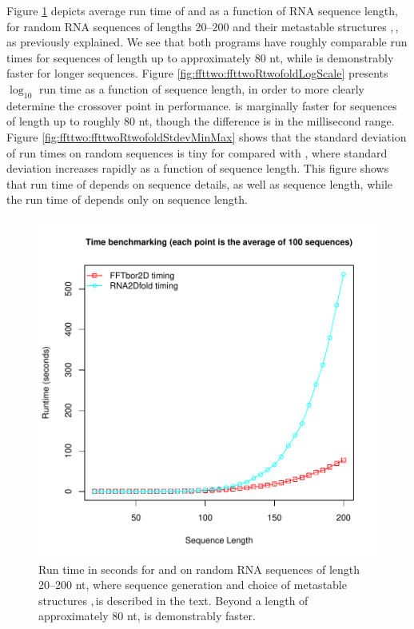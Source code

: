 Figure \ref{fig:ffttwo:ffttwoRtwofoldTiming} depicts average run time of \rnatwofold
and \ffttwo as a function of RNA sequence length, for random RNA
sequences of lengths 20--200 and their metastable structures \strA,\,\strB, as
previously explained.  We see that both programs have
roughly comparable run times for sequences of length up to approximately
80 nt, while \ffttwo is demonstrably faster for longer sequences.
Figure \ref{fig:ffttwo:ffttwoRtwofoldLogScale}
presents $\log_{10}$ run time as a function of sequence length, in order
to more clearly determine the crossover point in performance.
\rnatwofold is marginally faster for sequences of
length up to roughly 80 nt, though the difference is in the millisecond
range.
Figure \ref{fig:ffttwo:ffttwoRtwofoldStdevMinMax}
shows that the standard deviation of run times on random sequences is
tiny for \ffttwo compared with \rnatwofold, where standard
deviation increases rapidly as a function of sequence length. This figure
shows that run time of \rnatwofold depends on sequence details, as
well as sequence length, while the run time of \ffttwo depends only
on sequence length.

\begin{figure}[!ht]
\centering
\includegraphics[width=.9\textwidth]{Figures/FFTbor2D/ffttwoRtwofoldTiming.pdf}
\caption{
Run time in seconds for \rnatwofold and \ffttwo on random
RNA sequences of length 20--200 nt, where sequence generation and
choice of metastable structures \strA,\,\strB is described in the text.
Beyond a length of approximately 80 nt, \ffttwo is demonstrably
faster.
}
\label{fig:ffttwo:ffttwoRtwofoldTiming}
\end{figure}

